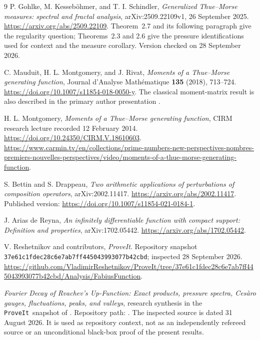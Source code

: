 \documentclass[11pt,a4paper]{article}
\numberwithin{equation}{section}
\theoremstyle{definition}
\theoremstyle{remark}
\newcommand{\repo}{\texttt{ProveIt}}
\begin{document}
\clearpage
{}
{}
\begin{thebibliography}{9}
P. Gohlke, M. Kesseb\"ohmer, and T. I. Schindler,
\emph{Generalized Thue--Morse measures: spectral and fractal analysis},
arXiv:2509.22109v1, 26 September 2025.
\url{https://arxiv.org/abs/2509.22109}.
Theorem~2.7 and its following paragraph give the regularity question;
Theorems~2.3 and 2.6 give the pressure identifications used for context
and the measure corollary. Version checked on 28 September 2026.

C. Mauduit, H. L. Montgomery, and J. Rivat,
\emph{Moments of a Thue--Morse generating function},
Journal d'Analyse Math\'ematique \textbf{135} (2018), 713--724.
\url{https://doi.org/10.1007/s11854-018-0050-y}.
The classical moment-matrix result is also described in the primary
author presentation \cite{MontgomeryTalk}.

H. L. Montgomery,
\emph{Moments of a Thue--Morse generating function},
CIRM research lecture recorded 12 February 2014.
\url{https://doi.org/10.24350/CIRM.V.18610603}.
\url{https://www.carmin.tv/en/collections/prime-numbers-new-perspectives-nombres-premiers-nouvelles-perspectives/video/moments-of-a-thue-morse-generating-function}.

S. Bettin and S. Drappeau,
\emph{Two arithmetic applications of perturbations of composition operators},
arXiv:2002.11417.
\url{https://arxiv.org/abs/2002.11417}.
Published version: \url{https://doi.org/10.1007/s11854-021-0184-1}.

J. Arias de Reyna,
\emph{An infinitely differentiable function with compact support:
Definition and properties}, arXiv:1702.05442.
\url{https://arxiv.org/abs/1702.05442}.

V. Reshetnikov and contributors, \emph{ProveIt}. Repository snapshot
\nolinkurl{37e61c1fdec28c6e7ab7ff445043993077b42cbd};
inspected 28 September 2026.
\url{https://github.com/VladimirReshetnikov/ProveIt/tree/37e61c1fdec28c6e7ab7ff445043993077b42cbd/Analysis/FabiusFunction}.

\emph{Fourier Decay of Rvachev's Up-Function: Exact products, pressure
spectra, Ces\`aro gauges, fluctuations, peaks, and valleys},
research synthesis in the \repo\ snapshot of \cite{ProveIt}.
Repository path:
.
The inspected source is dated 31 August 2026. It is used as repository
context, not as an independently refereed source or an unconditional
black-box proof of the present results.
\end{thebibliography}
\end{document}
